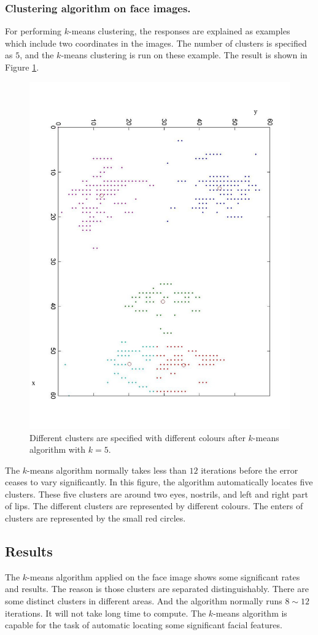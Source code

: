 \subsubsection{Clustering algorithm on face images.}
For performing $k$-means clustering, the responses are explained as examples which include two coordinates in the images. The number of clusters is specified as $5$, and the $k$-means clustering is run on these example. The result is shown in \mbox{Figure} \ref{fig:kmeanspointson2dspace}.
\begin{figure}[ht]
\begin{center}
 \includegraphics[width=0.66\columnwidth]{ch3/figures/kmeanspointson2dspace.png}
\caption{Different clusters are specified with different colours after $k$-means algorithm with $k=5$.}
\label{fig:kmeanspointson2dspace}
\end{center}
\end{figure} 
The $k$-means algorithm normally takes less than $12$ iterations before the error ceases to vary significantly. In this figure, the algorithm automatically locates five clusters. These five clusters are around two eyes, nostrils, and left and right part of lips. The different clusters are represented by different colours. The enters of clusters are represented by the small red circles.

\subsection{Results}
The $k$-means algorithm applied on the face image shows some significant rates and results. The reason is those clusters are separated distinguishably. There are some distinct clusters in different areas. And the algorithm normally runs $8\sim 12$ iterations. It will not take long time to compute. The $k$-means algorithm is capable for the task of automatic locating some significant facial features. 

